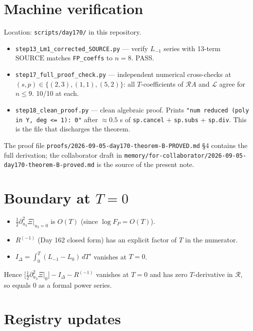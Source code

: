 \documentclass[11pt]{article}
\newcommand{\R}{\mathcal{R}}
\newcommand{\SOURCE}{\mathrm{SOURCE}}
\begin{document}
\section{Machine verification}

Location: \texttt{scripts/day170/} in this repository.

\begin{itemize}
  \item \texttt{step13\_Lm1\_corrected\_SOURCE.py} --- verify $L_{-1}$ series with 13-term $\SOURCE$ matches \texttt{FP\_coeffs} to $n=8$. PASS.
  \item \texttt{step17\_full\_proof\_check.py} --- independent numerical cross-checks at $(s, p) \in \{(2,3), (1,1), (5,2)\}$: all $T$-coefficients of $\mathcal{R}\!A$ and $\mathcal{L}$ agree for $n \le 9$. 10/10 at each.
  \item \texttt{step18\_clean\_proof.py} --- clean algebraic proof. Prints \texttt{"num reduced (poly in Y, deg <= 1): 0"} after $\approx 0.5$ s of \texttt{sp.cancel} + \texttt{sp.subs} + \texttt{sp.div}. This is the file that discharges the theorem.
\end{itemize}

The proof file \texttt{proofs/2026-09-05-day170-theorem-B-PROVED.md} \S 4 contains the full derivation; the collaborator draft in \texttt{memory/for-collaborator/2026-09-05-day170-theorem-B-proved.md} is the source of the present note.

\section{Boundary at $T=0$}

\begin{itemize}
  \item $\tfrac{1}{2}\partial_{u_3}^2 \Xi|_{u_3=0}$ is $O(T)$ (since $\log F_P = O(T)$).
  \item $R^{(-1)}$ (Day 162 closed form) has an explicit factor of $T$ in the numerator.
  \item $I_\Delta = \int_0^T (L_{-1} - L_0)\, dT'$ vanishes at $T=0$.
\end{itemize}
Hence $\bigl[\tfrac{1}{2}\partial_{u_3}^2 \Xi|_0\bigr] - I_\Delta - R^{(-1)}$ vanishes at $T = 0$ and has zero $T$-derivative in $\R$, so equals $0$ as a formal power series.

\section{Registry updates}
\end{document}
